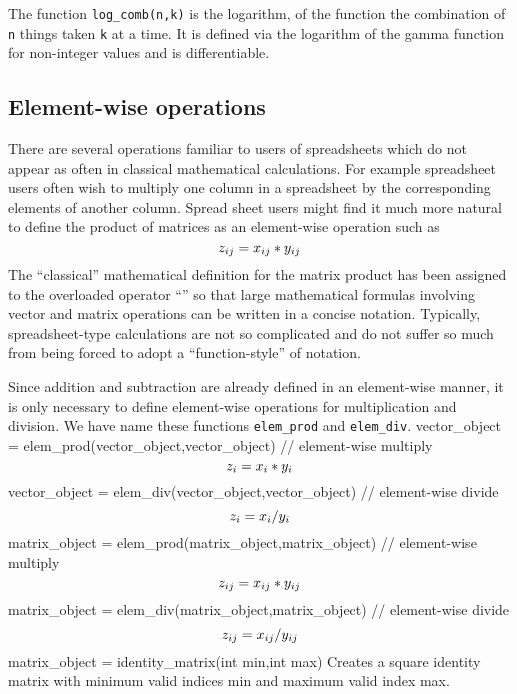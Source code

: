 The function {\tt log\_comb(n,k)} is the logarithm, of the  function
the combination of {\tt n} things taken {\tt k} at a time.
It is defined via the logarithm of the gamma function 
for non-integer values 
and is differentiable.


\subsection{Element-wise operations}
There are several operations familiar to users of spreadsheets which do
not appear as often in classical mathematical 
calculations. For example spreadsheet users often
wish to multiply one column in a spreadsheet by the corresponding
elements of another column. Spread sheet users might find it much more
natural to define the product of matrices as an element-wise operation
such as
$$\leftset{z_{ij}= x_{ij}*y_{ij}}$$
The ``classical'' mathematical definition for the
matrix product has been assigned to the overloaded operator ``{\tt *}''
so that large mathematical formulas involving
vector and matrix operations can be written in a concise notation.
Typically, spreadsheet-type calculations are not so complicated
and do not suffer so much from being forced to adopt a
``function-style'' of notation.

Since addition and subtraction are already defined in an element-wise manner,
it is only necessary to define element-wise operations 
for multiplication and
division. We have name these functions {\tt elem\_prod} and {\tt elem\_div}.
\beginexample
vector_object = elem_prod(vector_object,vector_object) // element-wise multiply 
\endexampledf
$$\leftset{z_i= x_i*y_i}$$
\beginexample
vector_object = elem_div(vector_object,vector_object) // element-wise divide
\endexampledf
$$\leftset{z_i= x_i/y_i}$$
\beginexample
matrix_object = elem_prod(matrix_object,matrix_object) // element-wise multiply 
\endexampledf
$$\leftset{z_{ij}= x_{ij}*y_{ij}}$$
\beginexample
matrix_object = elem_div(matrix_object,matrix_object) // element-wise divide
\endexampledf
$$\leftset{z_{ij}= x_{ij}/y_{ij}}$$
\beginexample
matrix_object = identity_matrix(int min,int max)
\endexample
\noindent Creates a square identity matrix with minimum valid indices min and 
maximum valid index max.


